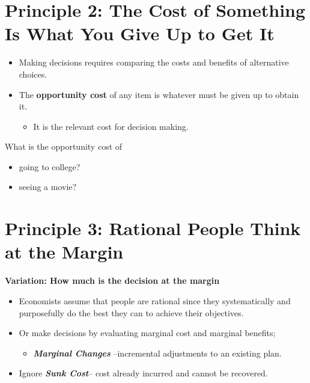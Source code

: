 \documentclass[
]{book}
\providecommand{\tightlist}{%
  \setlength{\itemsep}{0pt}\setlength{\parskip}{0pt}}
\begin{document}
\hypertarget{principle-2-the-cost-of-something-is-what-you-give-up-to-get-it}{%
\section{Principle 2: The Cost of Something Is What You Give Up to Get It}\label{principle-2-the-cost-of-something-is-what-you-give-up-to-get-it}}

\begin{itemize}
\item
  Making decisions requires comparing the costs and benefits of alternative choices.
\item
  The \textbf{\color{red} opportunity cost} of any item is whatever must be given up to obtain it.

  \begin{itemize}
  \tightlist
  \item
    It is the relevant cost for decision making.
  \end{itemize}
\end{itemize}

What is the opportunity cost of

\begin{itemize}
\item
  going to college?
\item
  seeing a movie?
\end{itemize}

\hypertarget{principle-3-rational-people-think-at-the-margin}{%
\section{Principle 3: Rational People Think at the Margin}\label{principle-3-rational-people-think-at-the-margin}}

\textbf{Variation: How much is the decision at the margin}

\begin{itemize}
\item
  Economists assume that people are rational since they systematically and purposefully do the best they can to achieve their objectives.
\item
  Or make decisions by evaluating marginal cost and marginal benefits;

  \begin{itemize}
  \tightlist
  \item
    \textbf{\emph{Marginal Changes}} --incremental adjustments to an existing plan.
  \end{itemize}
\item
  Ignore \textbf{\emph{Sunk Cost}}-- cost already incurred and cannot be recovered.
\end{itemize}
\end{document}
